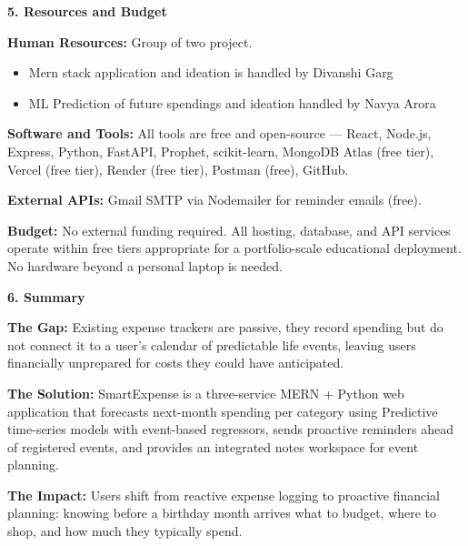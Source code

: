 \documentclass[12pt,a4paper]{article}\ref{}
\newcommand{\sectiontitle}[1]{%
    \vspace{8pt}
    \textbf{\large #1}
    \vspace{4pt}
}
\begin{document}

\sectiontitle{5. Resources and Budget}

\textbf{Human Resources:} Group of two project.

\begin{itemize}[leftmargin=1.5em]
    \item Mern stack application and ideation is handled by Divanshi Garg
    \item ML Prediction of future spendings and ideation handled by Navya Arora
\end{itemize}

\textbf{Software and Tools:} All tools are free and open-source — React, Node.js,
Express, Python, FastAPI, Prophet, scikit-learn, MongoDB Atlas (free tier), Vercel
(free tier), Render (free tier), Postman (free), GitHub.

\textbf{External APIs:} Gmail SMTP via Nodemailer for reminder emails (free).

\textbf{Budget:} No external funding required. All hosting, database, and API services
operate within free tiers appropriate for a portfolio-scale educational deployment.
No hardware beyond a personal laptop is needed.


\sectiontitle{6. Summary}

\textbf{The Gap:} Existing expense trackers are passive, they record spending but do not
connect it to a user's calendar of predictable life events, leaving users financially
unprepared for costs they could have anticipated.

\textbf{The Solution:} SmartExpense is a three-service MERN + Python web application
that forecasts next-month spending per category using Predictive time-series models
with event-based regressors, sends proactive reminders ahead of registered events,
and provides an integrated notes workspace for event planning.

\textbf{The Impact:} Users shift from reactive expense logging to proactive financial
planning: knowing before a birthday month arrives what to budget, where to shop,
and how much they typically spend.
\end{document}
